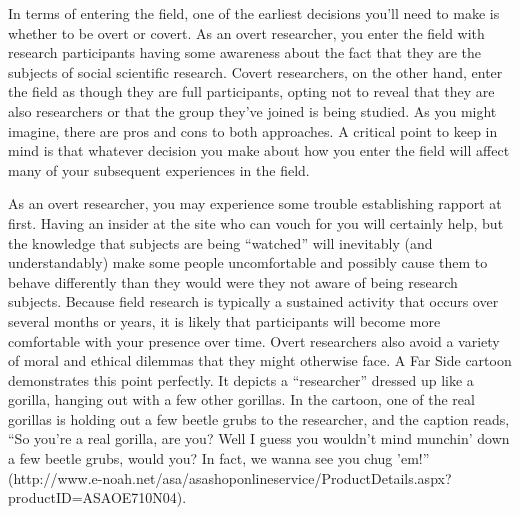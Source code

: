 In terms of entering the field, one of the earliest decisions you’ll need to make is whether to be overt or covert. As an overt researcher, you enter the field with research participants having some awareness about the fact that they are the subjects of social scientific research. Covert researchers, on the other hand, enter the field as though they are full participants, opting not to reveal that they are also researchers or that the group they’ve joined is being studied. As you might imagine, there are pros and cons to both approaches. A critical point to keep in mind is that whatever decision you make about how you enter the field will affect many of your subsequent experiences in the field.

As an overt researcher, you may experience some trouble establishing rapport at first. Having an insider at the site who can vouch for you will certainly help, but the knowledge that subjects are being ``watched'' will inevitably (and understandably) make some people uncomfortable and possibly cause them to behave differently than they would were they not aware of being research subjects. Because field research is typically a sustained activity that occurs over several months or years, it is likely that participants will become more comfortable with your presence over time. Overt researchers also avoid a variety of moral and ethical dilemmas that they might otherwise face. A Far Side cartoon demonstrates this point perfectly. It depicts a ``researcher'' dressed up like a gorilla, hanging out with a few other gorillas. In the cartoon, one of the real gorillas is holding out a few beetle grubs to the researcher, and the caption reads, ``So you’re a real gorilla, are you? Well I guess you wouldn’t mind munchin’ down a few beetle grubs, would you? In fact, we wanna see you chug ’em!'' (http://www.e-noah.net/asa/asashoponlineservice/ProductDetails.aspx?productID=ASAOE710N04).

